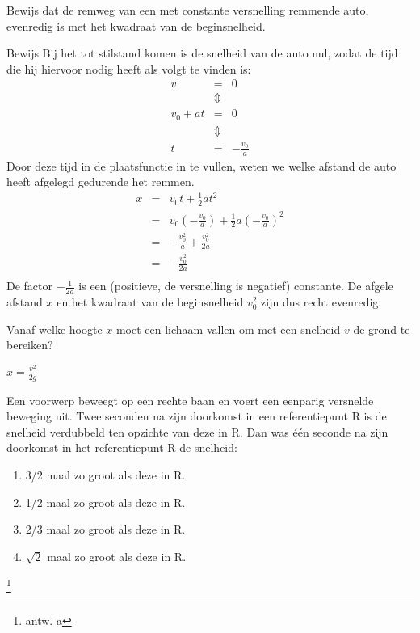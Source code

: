 \documentclass{ximera}
\begin{document}
\begin{exercise} Bewijs dat de remweg van een met constante versnelling remmende auto, evenredig is met het kwadraat van de beginsnelheid.
\begin{oplossing}
\item[Bewijs]Bij het tot stilstand komen is de snelheid van de auto nul, zodat de tijd die hij hiervoor nodig heeft als volgt te vinden is:
\begin{eqnarray*}
v&=&0\\
&\Updownarrow&\\
v_0+at&=&0\\
&\Updownarrow&\\
t&=&-\frac{v_0}{a}
\end{eqnarray*}
Door deze tijd in de plaatsfunctie in te vullen, weten we welke afstand de auto heeft afgelegd gedurende het remmen.
\begin{eqnarray*}
x&=&v_0t+\frac{1}{2}at^2\\
&=&v_0\left(-\frac{v_0}{a}\right)+\frac{1}{2}a\left(-\frac{v_0}{a}\right)^2\\
&=&-\frac{v_0^2}{a}+\frac{v_0^2}{2a}\\
&=&-\frac{v_0^2}{2a}\\
\end{eqnarray*}
De factor $-\frac{1}{2a}$ is een (positieve, de versnelling is negatief) constante. De afgele afstand $x$ en het kwadraat van de beginsnelheid $v_0^2$ zijn dus recht evenredig. 
\end{oplossing}

\end{exercise}

\begin{exercise} Vanaf welke hoogte $x$ moet een lichaam vallen om met een snelheid $v$ de grond te bereiken?

\begin{oplossing}
	$x=\frac{v^2}{2g}$
\end{oplossing}



\end{exercise}

\begin{exercise} Een voorwerp beweegt op een rechte baan en
voert een eenparig versnelde beweging uit. Twee seconden na zijn
doorkomst in een referentiepunt R is de snelheid verdubbeld ten
opzichte van deze in R.
\newline
\newline
Dan was \'e\'en seconde na zijn doorkomst in het referentiepunt R de
snelheid:
\begin{enumerate}
\item 3/2 maal zo groot als deze in R.
\item 1/2 maal zo groot als deze in R.
\item 2/3 maal zo groot als deze in R.
\item $\sqrt{2}$ maal zo groot als deze in R.
\end{enumerate}
\footnote{antw. a}



\end{exercise}
\end{document}
